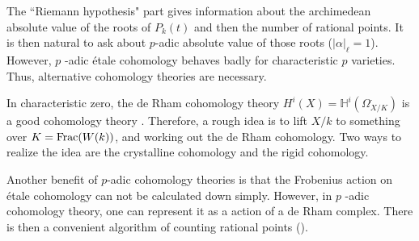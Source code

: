The ``Riemann hypothesis" part gives information about 
the archimedean absolute value of the roots of $P_k(t)$ 
and then the number of rational points. 
It is then natural to ask about $p$-adic absolute value of those roots 
($|\alpha|_{\ell} = 1$). 
However, $p$ -adic \'etale cohomology behaves badly for characteristic $p$ varieties. 
Thus, alternative cohomology theories are necessary.

In characteristic zero, the de Rham cohomology theory 
$H^i(X) = \mathbb{H}^i(\Omega_{X/K}^\cdot)$ 
is a good cohomology theory \cite{Sta}. 
Therefore, a rough idea is to lift $X/k$ to something over $K = \mathrm{Frac}(W(k))$, 
and working out the de Rham cohomology. 
Two ways to realize the idea are the crystalline cohomology and the rigid cohomology.

Another benefit of $p$-adic cohomology theories is that 
the Frobenius action on \'etale cohomology can not be calculated down simply. 
However, in $p$ -adic cohomology theory, 
one can represent it as a action of a de Rham complex. 
There is then a convenient algorithm of counting rational points (\cite{Ke2}).

